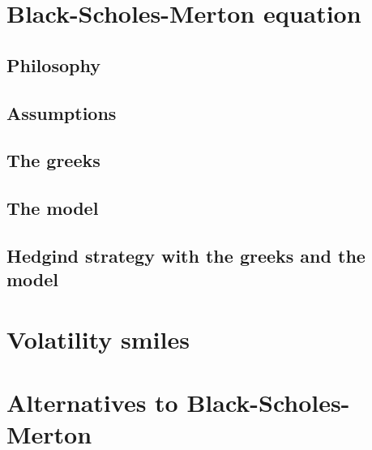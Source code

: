 \documentclass[12pt]{report}
\begin{document}
\section{Black-Scholes-Merton equation}
\subsection{Philosophy}
\subsection{Assumptions}
\subsection{The greeks}
\subsection{The model}
\subsection{Hedgind strategy with the greeks and the model}

\section{Volatility smiles}

\section{Alternatives to Black-Scholes-Merton}
\end{document}
